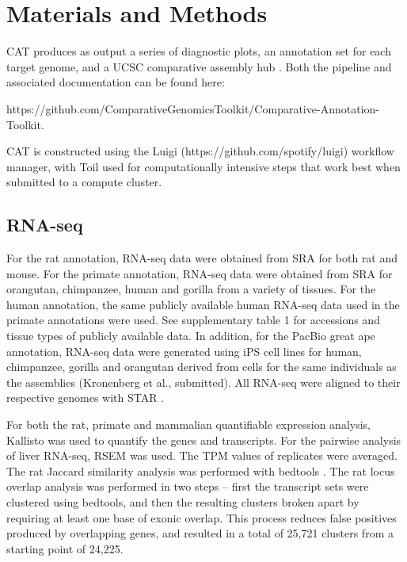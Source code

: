\documentclass[fleqn,10pt]{wlscirep}
\begin{document}
\section{Materials and Methods}
CAT produces as output a series of diagnostic plots, an annotation set for each target genome, and a UCSC comparative assembly hub \cite{nguyen2014comparative}. Both the pipeline and associated documentation can be found here: 

https://github.com/ComparativeGenomicsToolkit/Comparative-Annotation-Toolkit. 

CAT is constructed using the Luigi (https://github.com/spotify/luigi) workflow manager, with Toil \cite{vivian2017toil} used for computationally intensive steps that work best when submitted to a compute cluster. 


\subsection*{RNA-seq}

For the rat annotation, RNA-seq data were obtained from SRA for both rat and mouse. For the primate annotation, RNA-seq data were obtained from SRA for orangutan, chimpanzee, human and gorilla from a variety of tissues. For the human annotation, the same publicly available human RNA-seq data used in the primate annotations were used. See supplementary table 1 for accessions and tissue types of publicly available data. In addition, for the PacBio great ape annotation, RNA-seq data were generated using iPS cell lines for human, chimpanzee, gorilla and orangutan derived from cells for the same individuals as the assemblies (Kronenberg et al., submitted). All RNA-seq were aligned to their respective genomes with STAR \cite{dobin2013star}.

For both the rat, primate and mammalian quantifiable expression analysis, Kallisto \cite{bray2015near} was used to quantify the genes and transcripts. For the pairwise analysis of liver RNA-seq, RSEM \cite{li2011rsem} was used. The TPM values of replicates were averaged. The rat Jaccard similarity analysis was performed with bedtools \cite{quinlan2010bedtools}. The rat locus overlap analysis was performed in two steps -- first the transcript sets were clustered using bedtools, and then the resulting clusters broken apart by requiring at least one base of exonic overlap. This process reduces false positives produced by overlapping genes, and resulted in a total of 25,721 clusters from a starting point of 24,225.
\end{document}
